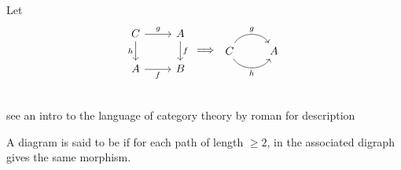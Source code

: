 \documentclass{book}
\begin{document}
	\begin{defn}
		Let 
		\[ 
		\begin{tikzcd}[baseline= 7]
			C \arrow[r, "g"] \arrow[d, "h"'] & A \arrow[d, "f"] \\
			A \arrow[r, "f"'] & B\\
		\end{tikzcd}
		\implies
		\begin{tikzcd}[baseline= 7]
			C \arrow[bend right=60, swap]{r}{h} \arrow[bend right=-60]{r}{g} & A  \\
		\end{tikzcd}
		\]
		
		see an intro to the language of category theory by roman for description
	\end{defn}
	
	
	\begin{defn}
		A diagram is said to be  if for each path of length $\geq 2$, in the associated digraph gives the same morphism.  
	\end{defn}
	
	
	
	\backmatter
	
	
	
	
	
	
	
	
	
	
	
	
	
	
\end{document}
